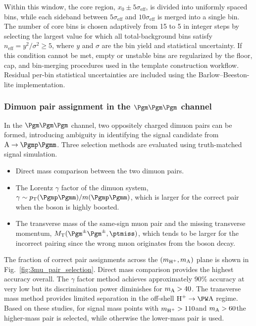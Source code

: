 Within this window, the core region, $x_0 \pm 5\sigma_{\mathrm{eff}}$, is divided into uniformly spaced bins, while each sideband between $5\sigma_{\mathrm{eff}}$ and $10\sigma_{\mathrm{eff}}$ is merged into a single bin. The number of core bins is chosen adaptively from 15 to 5 in integer steps by selecting the largest value for which all total-background bins satisfy $n_{\mathrm{eff}} = y^2/\sigma^2 \geq 5$, where $y$ and $\sigma$ are the bin yield and statistical uncertainty. If this condition cannot be met, empty or unstable bins are regularized by the floor, cap, and bin-merging procedures used in the template construction workflow. Residual per-bin statistical uncertainties are included using the Barlow--Beeston-lite implementation.

\subsubsection{Dimuon pair assignment in the $\Pgm\Pgm\Pgm$ channel}

In the $\Pgm\Pgm\Pgm$ channel, two oppositely charged dimuon pairs can be formed, introducing ambiguity in identifying the signal candidate from $\PA \to \Pgmp\Pgmm$. Three selection methods are evaluated using truth-matched signal simulation.
\begin{itemize}
  \item Direct mass comparison between the two dimuon pairs.
  \item The Lorentz $\gamma$ factor of the dimuon system, $\gamma \sim \pT(\Pgmp\Pgmm)/m(\Pgmp\Pgmm)$, which is larger for the correct pair when the \PA boson is highly boosted.
  \item The transverse mass of the same-sign muon pair and the missing transverse momentum, $M_{\mathrm{T}}(\Pgm^{\pm}\Pgm^{\pm}, \ptmiss)$, which tends to be larger for the incorrect pairing since the wrong muon originates from the \PW boson decay.
\end{itemize}
The fraction of correct pair assignments across the $(m_{\text{H}^+}, m_{\text{A}})$ plane is shown in Fig.~\ref{fig:3mu_pair_selection}. Direct mass comparison provides the highest accuracy overall. The $\gamma$ factor method achieves approximately 90\% accuracy at very low \mA but its discrimination power diminishes for $m_{\text{A}} > 40$\GeV. The transverse mass method provides limited separation in the off-shell $\PHp \to \PW\PA$ regime. Based on these studies, for signal mass points with $m_{\text{H}^+} > 110$\GeV and $m_{\text{A}} > 60$\GeV the higher-mass pair is selected, while otherwise the lower-mass pair is used.

